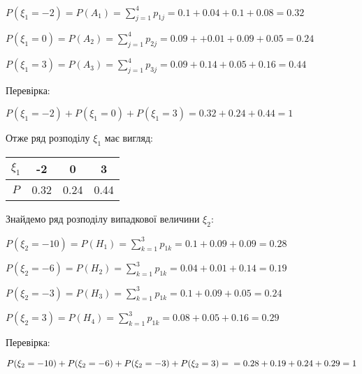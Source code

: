 \documentclass[a4paper, 20pt, titlepage]{article}
\begin{document}
$ P(\xi_1 = -2) = P(A_1) = \sum\limits_{j=1}^4 p_{1j} = 0.1 + 0.04 + 0.1 + 0.08 = 0.32$

$ P(\xi_1 = 0) = P(A_2) = \sum\limits_{j=1}^4 p_{2j} = 0.09 + + 0.01 + 0.09 + 0.05 = 0.24$

$ P(\xi_1 = 3) = P(A_3) = \sum\limits_{j=1}^4 p_{3j} = 0.09 + 0.14 + 0.05 + 0.16 = 0.44$

\newpage{}

\hspace{-6mm} Перевірка: 

\begin{center}
$P(\xi_1 = -2) + P(\xi_1 = 0) + P(\xi_1 = 3) = 0.32 + 0.24 + 0.44 = 1$
\end{center}

\hspace{-6mm} Отже ряд розподілу $\xi_1$ має вигляд:
\begin{center}
\begin{tabular}{|c|c|c|c|}
\hline 
$\xi_1$ & -2 & 0 & 3 \\ \hline
$P$ & 0.32 & 0.24 & 0.44 \\ \hline 
\end{tabular}
\end{center}

\vspace{4mm}

\hspace{-6mm} Знайдемо ряд розподілу випадкової величини $\xi_2:$
 
\vspace{4mm}

$P(\xi_2 = -10) = P(H_1) = \sum\limits_{k=1}^3 p_{1k} = 0.1 + 0.09 + 0.09 = 0.28$

$P(\xi_2 = -6) = P(H_2) = \sum\limits_{k=1}^3 p_{1k} =0.04 + 0.01 + 0.14 = 0.19$

$P(\xi_2 = -3) = P(H_3) = \sum\limits_{k=1}^3 p_{1k} = 0.1 + 0.09 + 0.05 = 0.24$

$P(\xi_2 = 3) = P(H_4) = \sum\limits_{k=1}^3 p_{1k} = 0.08 + 0.05 + 0.16 = 0.29$

\vspace{4mm}

\hspace{-6mm} Перевірка:

\begin{spacing}{1.4}
\begin{center}
$P(\xi_2 = -10) + P(\xi_2 = -6) + P(\xi_2 = -3) + P(\xi_2 = 3) =\newline = 0.28 + 0.19 + 0.24 + 0.29 = 1$
\end{center}
\end{spacing}
\end{document}
